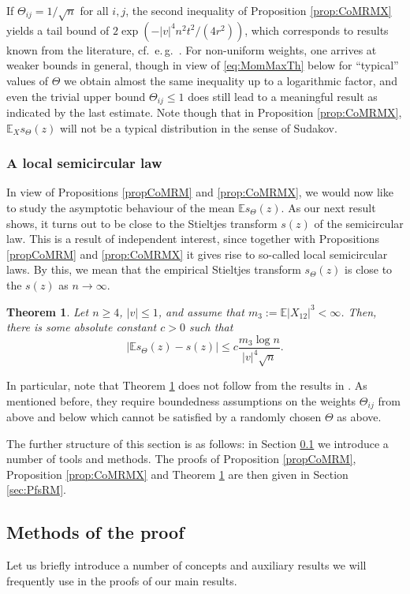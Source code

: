 \documentclass[a4paper,12pt]{amsart}
\numberwithin{equation}{section}
\newtheorem{satz}{Theorem}[section]
\theoremstyle{remark}
\def\E{{\mathbb E}}
\begin{document}
If $\Theta_{ij} = 1/\sqrt{n}$ for all $i,j$, the second inequality of Proposition \ref{prop:CoMRMX} yields a tail bound of $2\exp(-|v|^4n^2t^2/(4r^2))$, which corresponds to results known from the literature, cf.\ e.\,g.\ \cite[Ch.\ 2.3 \& 2.4]{AGZ10}. For non-uniform weights, one arrives at weaker bounds in general, though in view of \eqref{eq:MomMaxTh} below for ``typical'' values of $\Theta$ we obtain almost the same inequality up to a logarithmic factor, and even the trivial upper bound $\Theta_{ij} \le 1$ does still lead to a meaningful result as indicated by the last estimate. Note though that in Proposition \ref{prop:CoMRMX}, $\E_X s_\Theta(z)$ will not be a typical distribution in the sense of Sudakov.

\subsubsection{A local semicircular law}
In view of Propositions \ref{propCoMRM} and \ref{prop:CoMRMX}, we would now like to study the asymptotic behaviour of the mean $\E s_\Theta(z)$. As our next result shows, it turns out to be close to the Stieltjes transform $s(z)$ of the semicircular law. This is a result of independent interest, since together with Propositions \ref{propCoMRM} and \ref{prop:CoMRMX} it gives rise to so-called local semicircular laws. By this, we mean that the empirical Stieltjes transform $s_\Theta(z)$ is close to the $s(z)$ as $n \to \infty$.

\begin{satz}\label{MainThRM}
    Let $n \ge 4$, $|v| \le 1$, and assume that $m_3:= \E |X_{12}|^3 < \infty$. Then, there is some absolute constant $c>0$ such that
    \[
    |\E s_\Theta(z) - s(z)| \le c \frac{m_3\log n}{|v|^4\sqrt{n}}.
    \]
\end{satz}

In particular, note that Theorem \ref{MainThRM} does not follow from the results in \cite{EYY12}. As mentioned before, they require boundedness assumptions on the weights $\Theta_{ij}$ from above and below which cannot be satisfied by a randomly chosen $\Theta$ as above.

The further structure of this section is as follows: in Section \ref{sec:MethPf} we introduce a number of tools and methods. The proofs of Proposition \ref{propCoMRM}, Proposition \ref{prop:CoMRMX} and Theorem \ref{MainThRM} are then given in Section \ref{sec:PfsRM}.

\subsection{Methods of the proof}\label{sec:MethPf}
Let us briefly introduce a number of concepts and auxiliary results we will frequently use in the proofs of our main results.
\end{document}

